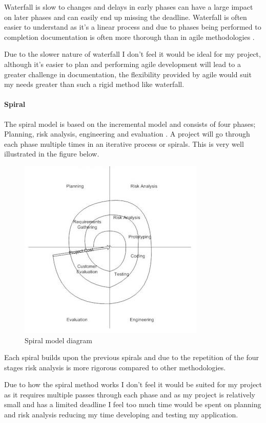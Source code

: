 Waterfall is slow to changes and delays in early phases can have a large
impact on later phases and can easily end up missing the deadline.
Waterfall is often easier to understand as it's a linear process and due
to phases being performed to completion documentation is often more
thorough than in agile methodologies \parencite{agilevswaterfall}.

Due to the slower nature of waterfall I don't feel it would be ideal for
my project, although it's easier to plan and performing agile
development will lead to a greater challenge in documentation, the
flexibility provided by agile would suit my needs greater than such a
rigid method like waterfall.

\paragraph{Spiral}\label{spiral}

The spiral model is based on the incremental model and consists of four
phases; Planning, risk analysis, engineering and evaluation
\parencite{spiral}. A project will go through each phase multiple times
in an iterative process or spirals. This is very well illustrated in the
figure below.

\begin{figure}[htbp]
\centering
\includegraphics{../../Images/Spiral-model.jpg}
\caption{Spiral model diagram \parencite{spiral}}
\end{figure}

Each spiral builds upon the previous spirals and due to the repetition
of the four stages risk analysis is more rigorous compared to other
methodologies.

Due to how the spiral method works I don't feel it would be suited for
my project as it requires multiple passes through each phase and as my
project is relatively small and has a limited deadline I feel too much
time would be spent on planning and risk analysis reducing my time
developing and testing my application.

